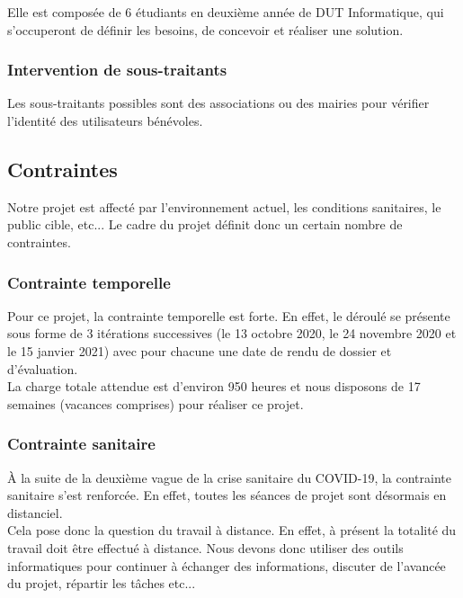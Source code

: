 \documentclass[a4paper,11pt]{article}
\begin{document}
Elle est composée de 6 étudiants en deuxième année de DUT Informatique, qui s’occuperont de définir les
besoins, de concevoir et réaliser une solution.\\

\subsubsection{Intervention de sous-traitants}

Les sous-traitants possibles sont des associations ou des mairies pour vérifier l’identité des utilisateurs
bénévoles.\\


\subsection{Contraintes}

Notre projet est affecté par l’environnement actuel, les conditions sanitaires, le public cible, etc...
Le cadre du projet définit donc un certain nombre de contraintes.

\subsubsection{Contrainte temporelle}

Pour ce projet, la contrainte temporelle est forte. En effet, le déroulé se présente sous forme de
3 itérations successives (le 13 octobre 2020, le 24 novembre 2020 et le 15 janvier 2021) avec pour
chacune une date de rendu de dossier et d’évaluation.\\

La charge totale attendue est d’environ 950 heures et nous disposons de 17 semaines (vacances
comprises) pour réaliser ce projet.\\

\subsubsection{Contrainte sanitaire}

À la suite de la deuxième vague de la crise sanitaire du COVID-19, la contrainte sanitaire s'est renforcée.
En effet, toutes les séances de projet sont désormais en distanciel.\\

Cela pose donc la question du travail à distance. En effet, à présent la totalité du travail doit être effectué à distance. Nous devons donc utiliser des outils informatiques pour continuer à échanger des
informations, discuter de l’avancée du projet, répartir les tâches etc...\\
\end{document}
